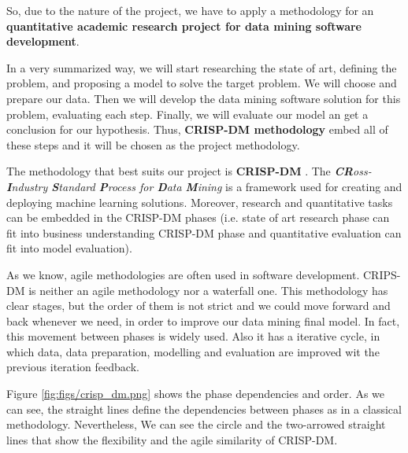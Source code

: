So, due to the nature of the project, we have to apply a methodology for an \textbf{quantitative academic research project for data mining software development}. 

\begin{tcolorbox}
In a very summarized way, we will start researching the state of art, defining the problem, and proposing a model to solve the target problem. We will choose and prepare our data. Then we will develop the data mining software solution for this problem, evaluating each step. Finally, we will evaluate our model an get a conclusion for our hypothesis. Thus, \textbf{CRISP-DM methodology} embed all of these steps and it will be chosen as the project methodology.
\end{tcolorbox}

The methodology that best suits our project is \textbf{CRISP-DM} \cite{crisp}. The \textit{\textbf{CR}oss-\textbf{I}ndustry \textbf{S}tandard \textbf{P}rocess for \textbf{D}ata \textbf{M}ining} is a framework used for creating and deploying machine learning solutions. Moreover, research and quantitative tasks can be embedded  in the CRISP-DM phases (i.e. state of art research phase can fit into business understanding CRISP-DM phase and quantitative evaluation can fit into model evaluation).

As we know, agile methodologies are often used in software development. CRIPS-DM is neither an agile methodology nor a waterfall one. This methodology has clear stages, but the order of them is not strict and we could move forward and back whenever we need, in order to improve our data mining final model. In fact, this movement between phases is widely used. Also it has a iterative cycle, in which data, data preparation, modelling and evaluation are improved wit the previous iteration feedback.

Figure \ref{fig:figs/crisp_dm.png} shows the phase dependencies and order. As we can see, the straight lines define the dependencies between phases as in a classical methodology. Nevertheless, We can see the circle and the two-arrowed straight lines that show the flexibility and the agile similarity of CRISP-DM.




